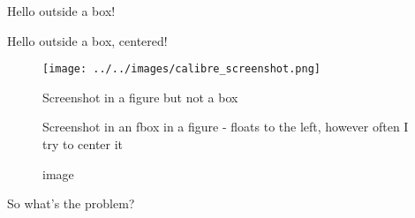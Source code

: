 \documentclass[pagesize=auto]{scrbook}
\begin{document}
Hello outside a box!

\begin{center}
Hello outside a box, centered!
\end{center}

\begin{figure}
  \texttt{[image: ../../images/calibre\_screenshot.png]}
  \caption{Screenshot in a figure but not a box}
\end{figure}

\begin{center}
\begin{figure}
  \begin{center}
  \caption{Screenshot in an fbox in a figure - floats to the left, however often I try to center it}
  \end{center}
\end{figure}
\end{center}

\begin{figure}
    \begin{minipage}{0.6\textwidth}
        \par
        \par
    \end{minipage}
    \begin{minipage}{0.375\textwidth}
        \centering 
        image
    \end{minipage}
\end{figure}

So what's the problem?
\end{document}

